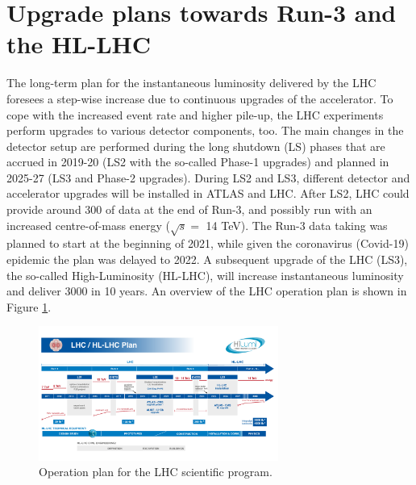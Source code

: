 \section{Upgrade plans towards Run-3 and the HL-LHC}
\label{chap2:Upgrad}
The long-term plan for the instantaneous luminosity delivered by the LHC foresees a step-wise increase due to continuous upgrades of the accelerator. To cope with the increased event rate and higher pile-up, the LHC experiments perform upgrades to various detector components, too. The main changes in the detector setup are performed during the long shutdown (LS) phases that are accrued in 2019-20 (LS2 with the so-called Phase-1 upgrades) and planned in 2025-27 (LS3 and Phase-2 upgrades). During LS2 and LS3, different detector and accelerator upgrades will be installed in ATLAS and LHC. After LS2, LHC could provide around 300 \ifb of data at the end of Run-3, and possibly run with an increased centre-of-mass energy ($\sqrt{s} = $ 14 TeV). The Run-3 data taking was planned to start at the beginning of 2021, while given the coronavirus (Covid-19) epidemic the plan was delayed to 2022.  A subsequent upgrade of the LHC (LS3), the so-called High-Luminosity (HL-LHC), will increase instantaneous luminosity and deliver 3000 \ifb in 10 years.  An overview of the LHC operation plan is shown in Figure \ref{fig:chap2:Upgrad}.
\begin{figure}[htbp]
    \centering
    \includegraphics[width=0.7\textwidth]{Ch2/Img/HL-LHC-plan-2021-1.pdf}
    \caption{Operation plan for the LHC scientific program.}
    \label{fig:chap2:Upgrad}
\end{figure}
\\
